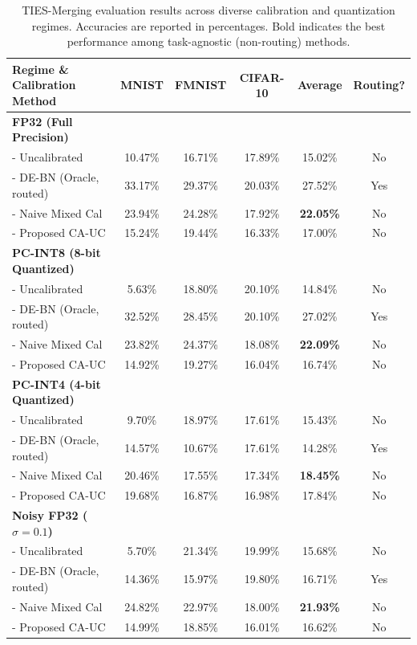 \documentclass{article}
\theoremstyle{plain}
\theoremstyle{definition}
\theoremstyle{remark}
\begin{document}
\begin{table}[H]
\caption{TIES-Merging evaluation results across diverse calibration and quantization regimes. Accuracies are reported in percentages. Bold indicates the best performance among task-agnostic (non-routing) methods.}
\label{tab:ties_results}
\vskip 0.1in
\begin{center}
\begin{small}
\begin{tabular}{lccccc}
\toprule
Regime \& Calibration Method & MNIST & FMNIST & CIFAR-10 & Average & Routing? \\
\midrule
\textbf{FP32 (Full Precision)} & & & & & \\
- Uncalibrated & 10.47\% & 16.71\% & 17.89\% & 15.02\% & No \\
- DE-BN (Oracle, routed) & 33.17\% & 29.37\% & 20.03\% & 27.52\% & Yes \\
- Naive Mixed Cal & 23.94\% & 24.28\% & 17.92\% & \textbf{22.05\%} & No \\
- Proposed CA-UC & 15.24\% & 19.44\% & 16.33\% & 17.00\% & No \\
\midrule
\textbf{PC-INT8 (8-bit Quantized)} & & & & & \\
- Uncalibrated & 5.63\% & 18.80\% & 20.10\% & 14.84\% & No \\
- DE-BN (Oracle, routed) & 32.52\% & 28.45\% & 20.10\% & 27.02\% & Yes \\
- Naive Mixed Cal & 23.82\% & 24.37\% & 18.08\% & \textbf{22.09\%} & No \\
- Proposed CA-UC & 14.92\% & 19.27\% & 16.04\% & 16.74\% & No \\
\midrule
\textbf{PC-INT4 (4-bit Quantized)} & & & & & \\
- Uncalibrated & 9.70\% & 18.97\% & 17.61\% & 15.43\% & No \\
- DE-BN (Oracle, routed) & 14.57\% & 10.67\% & 17.61\% & 14.28\% & Yes \\
- Naive Mixed Cal & 20.46\% & 17.55\% & 17.34\% & \textbf{18.45\%} & No \\
- Proposed CA-UC & 19.68\% & 16.87\% & 16.98\% & 17.84\% & No \\
\midrule
\textbf{Noisy FP32 ($\sigma = 0.1$)} & & & & & \\
- Uncalibrated & 5.70\% & 21.34\% & 19.99\% & 15.68\% & No \\
- DE-BN (Oracle, routed) & 14.36\% & 15.97\% & 19.80\% & 16.71\% & Yes \\
- Naive Mixed Cal & 24.82\% & 22.97\% & 18.00\% & \textbf{21.93\%} & No \\
- Proposed CA-UC & 14.99\% & 18.85\% & 16.01\% & 16.62\% & No \\
\bottomrule
\end{tabular}
\end{small}
\end{center}
\end{table}
\end{document}
